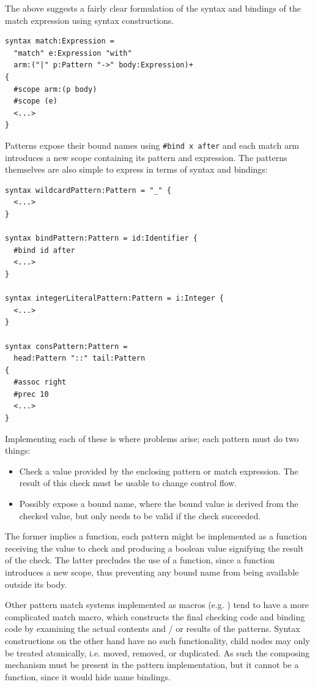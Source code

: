 \documentclass{kththesis}
\begin{document}
The above suggests a fairly clear formulation of the syntax and bindings of the match expression using syntax constructions.

\begin{verbatim}
syntax match:Expression =
  "match" e:Expression "with"
  arm:("|" p:Pattern "->" body:Expression)+
{
  #scope arm:(p body)
  #scope (e)
  <...>
}
\end{verbatim}

Patterns expose their bound names using \texttt{#bind x after} and each match arm introduces a new scope containing its pattern and expression. The patterns themselves are also simple to express in terms of syntax and bindings:

\begin{verbatim}
syntax wildcardPattern:Pattern = "_" {
  <...>
}

syntax bindPattern:Pattern = id:Identifier {
  #bind id after
  <...>
}

syntax integerLiteralPattern:Pattern = i:Integer {
  <...>
}

syntax consPattern:Pattern =
  head:Pattern "::" tail:Pattern
{
  #assoc right
  #prec 10
  <...>
}
\end{verbatim}


Implementing each of these is where problems arise; each pattern must do two things:

\begin{itemize}
  \item Check a value provided by the enclosing pattern or match expression. The result of this check must be usable to change control flow.
  \item Possibly expose a bound name, where the bound value is derived from the checked value, but only needs to be valid if the check succeeded.
\end{itemize}

The former implies a function, each pattern might be implemented as a function receiving the value to check and producing a boolean value signifying the result of the check. The latter precludes the use of a function, since a function introduces a new scope, thus preventing any bound name from being available outside its body.

Other pattern match systems implemented as macros (e.g. \cite{Tobin-Hochstadt2011Extensible-Patt}) tend to have a more complicated match macro, which constructs the final checking code and binding code by examining the actual contents and / or results of the patterns. Syntax constructions on the other hand have no such functionality, child nodes may only be treated atomically, i.e. moved, removed, or duplicated. As such the composing mechanism must be present in the pattern implementation, but it cannot be a function, since it would hide name bindings.
\end{document}
